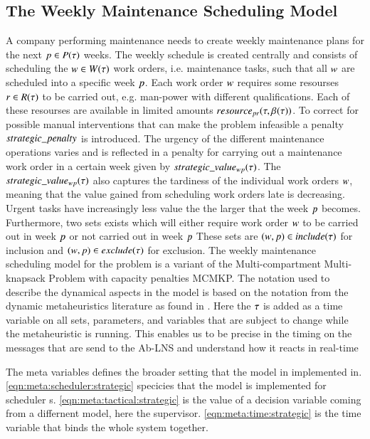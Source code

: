 \subsection{The Weekly Maintenance Scheduling Model}
A company performing maintenance needs to create weekly maintenance plans for
the next $p \in P(\tau)$ weeks. The weekly schedule is created
centrally and consists of scheduling the $\ElementWorkOrder \in \SetWorkOrder$
work orders, i.e. maintenance tasks, such that all $w$
are scheduled into a specific week $p$. Each work order $
w$ requires some resourses $r \in R(\tau)$
to be carried out, e.g. man-power with different qualifications. Each of these
resourses are available in limited amounts $resource_{pr}(\tau, \beta_{}(\tau))$. To correct
for possible manual interventions that can make the problem infeasible a penalty
$strategic\_penalty$ is introduced. The urgency of the different maintenance operations
varies and is reflected in a penalty for carrying out a maintenance work
order in a certain week given by $strategic\_value_{w p}(\tau)$. The $strategic\_value_{w p}(\tau)$ also 
captures the tardiness of the individual work orders $w$, meaning that
the value gained from scheduling work orders late is decreasing. Urgent tasks have
increasingly less value the the larger that the week $p$ becomes. 
Furthermore, two sets exists which will either require work order $w$ to be carried
out in week $p$ or not carried out in week $p$ 
These sets are $(w,p) \in
include(\tau)$ for inclusion and  $(w, p) \in
exclude(\tau)$ for exclusion. The weekly maintenance scheduling model for the problem 
is a variant of the  Multi-compartment Multi-knapsack Problem with capacity penalties MCMKP. 
The notation used to describe the dynamical aspects in the model is based on the notation 
from the dynamic metaheuristics literature as found in \cite{yangMetaheuristicsDynamicCombinatorial2013}. 
Here the $\tau$ is added as a time variable on all sets, parameters, and variables that are
subject to change while the metaheuristic is running. This enables us to be precise in the timing on 
the messages that are send to the Ab-LNS and understand how it reacts in real-time



The meta variables defines the broader setting that the model in implemented in.
\eqref{eqn:meta:scheduler:strategic} specicies that the model is
implemented for scheduler s. \eqref{eqn:meta:tactical:strategic} is the value
of a decision variable coming from a differnent model, here the supervisor. 
\eqref{eqn:meta:time:strategic} is the time variable that binds the whole 
system together. 

